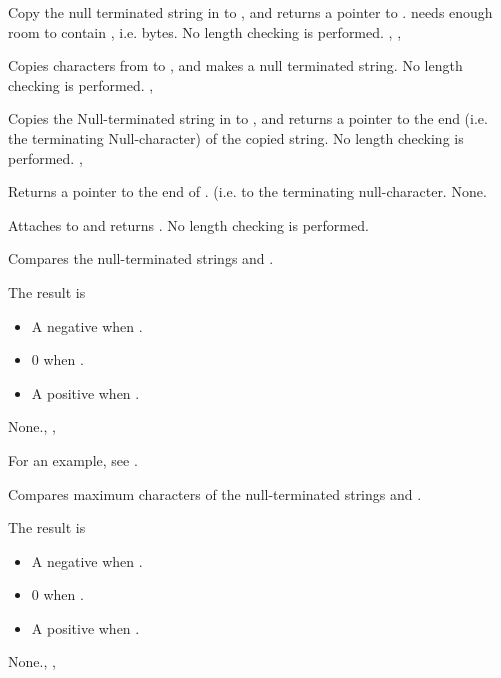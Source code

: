 { 
Copy the null terminated string in  to , and
returns a pointer to .  needs enough room to contain
, i.e.  bytes.
}
{No length checking is performed.}{ , , }



{
Copies  characters from  to , and makes
 a null terminated string. 
}
{No length checking is performed.}
{, }
 


{
Copies the Null-terminated string in  to , and
returns a pointer to the end (i.e. the terminating Null-character) of the
copied string.
}
{No length checking is performed.}
{, }



{
Returns a pointer to the end of . (i.e. to the terminating
null-character.
}
{None.}{}



{
Attaches  to  and returns .
}
{No length checking is performed.}
{}



{
Compares the null-terminated strings  and .

The result is 
\begin{itemize}
\item A negative  when .
\item 0 when .
\item A positive  when .
\end{itemize}
}
{None.}{, , }

For an example, see .

{
Compares maximum  characters of the null-terminated strings 
 and . 

The result is 
\begin{itemize}
\item A negative  when .
\item 0 when .
\item A positive  when .
\end{itemize}
}
{None.}{, , }

